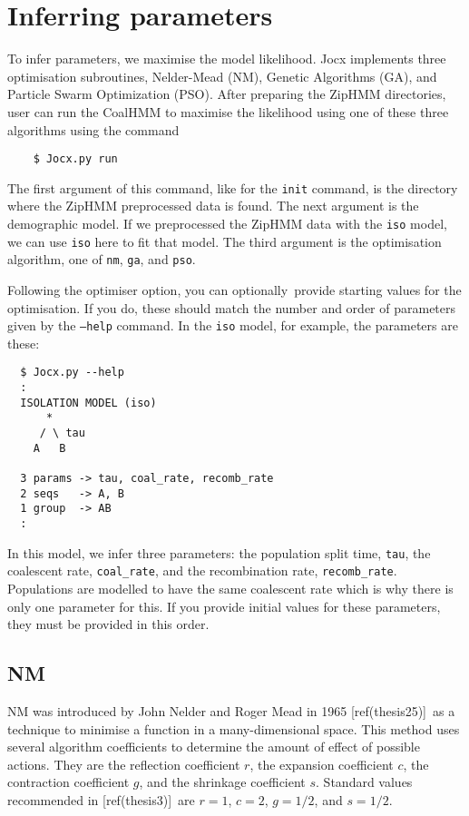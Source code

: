 \documentclass[graybox]{svmult}
\begin{document}
\section{Inferring parameters}

To infer parameters, we maximise the model likelihood. Jocx implements three optimisation subroutines, Nelder-Mead (NM), Genetic Algorithms (GA), and Particle Swarm Optimization (PSO). After preparing the ZipHMM directories, user can run the CoalHMM to maximise the likelihood using one of these three algorithms using the command
{\small{}\begin{verbatim}
    $ Jocx.py run
\end{verbatim}}
The first argument of this command, like for the \texttt{init} command, is the directory where the ZipHMM preprocessed data is found. The next argument is the demographic model. If we preprocessed the ZipHMM data with the \texttt{iso} model, we can use \texttt{iso} here to fit that model. The third argument is the optimisation algorithm, one of \texttt{nm}, \texttt{ga}, and \texttt{pso}.

Following the optimiser option, you can optionally\ provide starting values for the optimisation. If you do, these should match the number and order of parameters given by the \texttt{--help} command. In the \texttt{iso} model, for example, the parameters are these:

{\small{}\begin{verbatim}
  $ Jocx.py --help
  :
  ISOLATION MODEL (iso)
      *
     / \ tau
    A   B

  3 params -> tau, coal_rate, recomb_rate
  2 seqs   -> A, B
  1 group  -> AB
  :
\end{verbatim}}

In this model, we infer three parameters: the population split time, \texttt{tau}, the coalescent rate, \texttt{coal\_rate}, and the recombination rate, \texttt{recomb\_rate}. Populations are modelled to have the same coalescent rate which is why there is only one parameter for this. If you provide initial values for these parameters, they must be provided in this order.

\subsection{NM}

NM was introduced by John Nelder and Roger Mead in 1965 [ref(thesis25)]\  as a technique to minimise a function in a many-dimensional space. This method uses several algorithm coefficients to determine the amount of effect of possible actions. They are the reflection coefficient $r$, the expansion coefficient $c$, the contraction coefficient $g$, and the shrinkage coefficient $s$. Standard values recommended in [ref(thesis3)]\ are $r = 1$, $c = 2$, $g = 1/2$, and $s = 1/2$.
\end{document}
